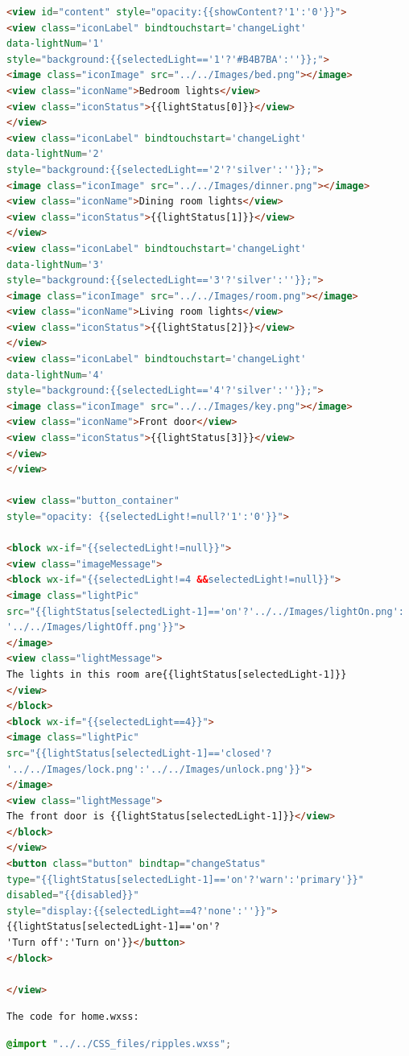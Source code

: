 \documentclass[12pt,a4paper]{report}
\begin{document}
\begin{appendices}
\begin{lstlisting}[language={html}]
<view id="content" style="opacity:{{showContent?'1':'0'}}">
<view class="iconLabel" bindtouchstart='changeLight' 
data-lightNum='1'  
style="background:{{selectedLight=='1'?'#B4B7BA':''}};">
<image class="iconImage" src="../../Images/bed.png"></image>
<view class="iconName">Bedroom lights</view>
<view class="iconStatus">{{lightStatus[0]}}</view>
</view>
<view class="iconLabel" bindtouchstart='changeLight' 
data-lightNum='2' 
style="background:{{selectedLight=='2'?'silver':''}};">
<image class="iconImage" src="../../Images/dinner.png"></image>
<view class="iconName">Dining room lights</view>
<view class="iconStatus">{{lightStatus[1]}}</view>
</view>
<view class="iconLabel" bindtouchstart='changeLight' 
data-lightNum='3' 
style="background:{{selectedLight=='3'?'silver':''}};">
<image class="iconImage" src="../../Images/room.png"></image>
<view class="iconName">Living room lights</view>
<view class="iconStatus">{{lightStatus[2]}}</view>
</view>
<view class="iconLabel" bindtouchstart='changeLight' 
data-lightNum='4' 
style="background:{{selectedLight=='4'?'silver':''}};">
<image class="iconImage" src="../../Images/key.png"></image>
<view class="iconName">Front door</view>
<view class="iconStatus">{{lightStatus[3]}}</view>
</view>
</view>

<view class="button_container" 
style="opacity: {{selectedLight!=null?'1':'0'}}">

<block wx-if="{{selectedLight!=null}}">
<view class="imageMessage">
<block wx-if="{{selectedLight!=4 &&selectedLight!=null}}">
<image class="lightPic" 
src="{{lightStatus[selectedLight-1]=='on'?'../../Images/lightOn.png':
'../../Images/lightOff.png'}}">
</image>
<view class="lightMessage">
The lights in this room are{{lightStatus[selectedLight-1]}}
</view>
</block>
<block wx-if="{{selectedLight==4}}">
<image class="lightPic" 
src="{{lightStatus[selectedLight-1]=='closed'?
'../../Images/lock.png':'../../Images/unlock.png'}}">
</image>
<view class="lightMessage">
The front door is {{lightStatus[selectedLight-1]}}</view>
</block>
</view>
<button class="button" bindtap="changeStatus"
type="{{lightStatus[selectedLight-1]=='on'?'warn':'primary'}}" 
disabled="{{disabled}}" 
style="display:{{selectedLight==4?'none':''}}">
{{lightStatus[selectedLight-1]=='on'?
'Turn off':'Turn on'}}</button>
</block>

</view>
\end{lstlisting}

\begin{verbatim}
The code for home.wxss:
\end{verbatim}
\vspace{-0.5cm}
\begin{lstlisting}[language={css}]
@import "../../CSS_files/ripples.wxss";


\end{lstlisting}
\end{appendices}
\end{document}

